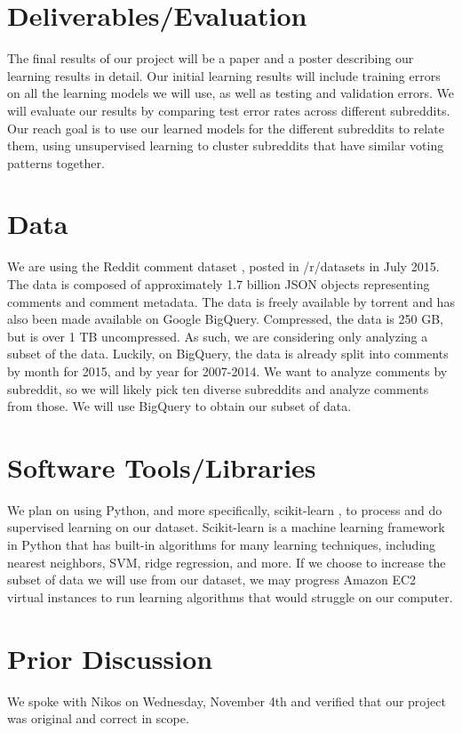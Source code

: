 \documentclass[11pt, twocolumn]{article}
\begin{document}
\section{Deliverables/Evaluation}
The final results of our project will be a paper and a poster describing our learning results in detail.  Our initial learning results will include training errors on all the learning models we will use, as well as testing and validation errors. We will evaluate our results by comparing test error rates across different subreddits. Our reach goal is to use our learned models for the different subreddits to relate them, using unsupervised learning to cluster subreddits that have similar voting patterns together. 

\section{Data}
We are using the Reddit comment dataset \cite{dataset}, posted in /r/datasets in July 2015.  The data is composed of approximately 1.7 billion JSON objects representing comments and comment metadata.  The data is freely available by torrent and has also been made available on Google BigQuery.  Compressed, the data is 250 GB, but is over 1 TB uncompressed.  As such, we are considering only analyzing a subset of the data.  Luckily, on BigQuery, the data is already split into comments by month for 2015, and by year for 2007-2014.  We want to analyze comments by subreddit, so we will likely pick ten diverse subreddits and analyze comments from those.  We will use BigQuery to obtain our subset of data. 

\section{Software Tools/Libraries} 
We plan on using Python, and more specifically, scikit-learn \cite{scikit-learn}, to process and do supervised learning on our dataset.  Scikit-learn is a machine learning framework in Python that has built-in algorithms for many learning techniques, including nearest neighbors, SVM, ridge regression, and more. If we choose to increase the subset of data we will use from our dataset, we may progress Amazon EC2 virtual instances to run learning algorithms that would struggle on our computer.

\section{Prior Discussion}
We spoke with Nikos on Wednesday, November 4th and verified that our project was original and correct in scope.



\end{document}

